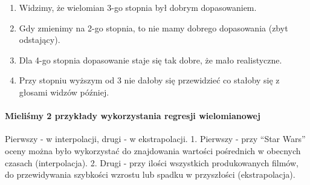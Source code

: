 \documentclass[11pt]{article}
\begin{document}
\begin{enumerate}
\def\labelenumi{\arabic{enumi}.}
\item
  Widzimy, że wielomian 3-go stopnia był dobrym dopasowaniem.
\item
  Gdy zmienimy na 2-go stopnia, to nie mamy dobrego dopasowania (zbyt
  odstający).
\item
  Dla 4-go stopnia dopasowanie staje się tak dobre, że mało
  realistyczne.
\item
  Przy stopniu wyższym od 3 nie dałoby się przewidzieć co stałoby się z
  głosami widzów później.
\end{enumerate}

\hypertarget{mieliux15bmy-2-przykux142ady-wykorzystania-regresji-wielomianowej}{%
\paragraph{Mieliśmy 2 przykłady wykorzystania regresji
wielomianowej}\label{mieliux15bmy-2-przykux142ady-wykorzystania-regresji-wielomianowej}}

Pierwszy - w interpolacji, drugi - w ekstrapolacji. 1. Pierwszy - przy
``Star Wars'' oceny można było wykorzystać do znajdowania wartości
pośrednich w obecnych czasach (interpolacja). 2. Drugi - przy ilości
wszystkich produkowanych filmów, do przewidywania szybkości wzrostu lub
spadku w przyszłości (ekstrapolacja).


    
    
    
\end{document}
